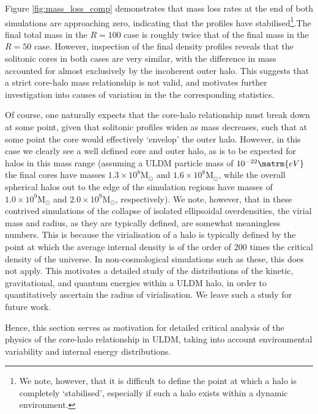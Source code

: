 \documentclass[a4paper,11pt]{article}
\begin{document}
Figure \ref{fig:mass_loss_comp} demonstrates that mass loss rates at the end of both simulations are approaching zero, indicating that the profiles have stabilised\footnote{We note, however, that it is difficult to define the point at which a halo is completely `stabilised', especially if such a halo exists within a dynamic environment.}.The final total mass in the $R = 100$ case is roughly twice that of the final mass in the $R = 50$ case. However, inspection of the final density profiles reveals that the solitonic cores in both cases are very similar, with the difference in mass accounted for almost exclusively by the incoherent outer halo. This suggests that a strict core-halo mass relationship is not valid, and motivates further investigation into causes of variation in the the corresponding statistics.

Of course, one naturally expects that the core-halo relationship must break down at some point, given that solitonic profiles widen as mass decreases, such that at some point the core would effectively `envelop' the outer halo. However, in this case we clearly see a well defined core and outer halo, as is to be expected for halos in this mass range (assuming a ULDM particle mass of $10^{-22}\matrm{eV}$ the final cores have masses $1.3\times 10^8 \mathrm{M}_\odot$ and $1.6\times 10^8 \mathrm{M}_\odot$, while the overall spherical halos out to the edge of the simulation regions have masses of $1.0\times 10^9 \mathrm{M}_\odot$ and $2.0\times 10^9 \mathrm{M}_\odot$, respectively). We note, however, that in these contrived simulations of the collapse of isolated ellipsoidal overdensities, the virial mass and radius, as they are typically defined, are somewhat meaningless numbers. This is because the virialisation of a halo is typically defined by the point at which the average internal density is of the order of 200 times the critical density of the universe. In non-cosmological simulations such as these, this does not apply. This motivates a detailed study of the distributions of the kinetic, gravitational, and quantum energies within a ULDM halo, in order to quantitatively ascertain the radius of virialisation. We leave such a study for future work.  

Hence, this section serves as motivation for detailed critical analysis of the physics of the core-halo relationship in ULDM, taking into account environmental variability and internal energy distributions.

\end{document}
